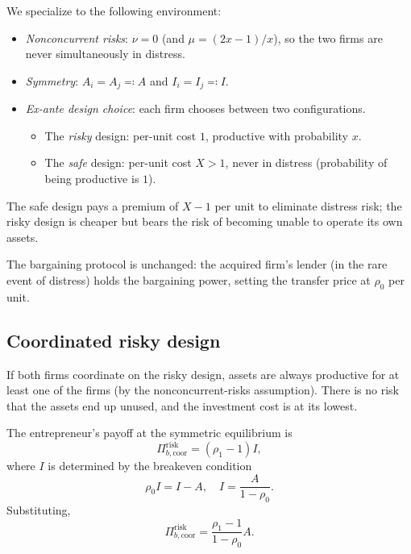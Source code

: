 \documentclass[11pt,a4paper,oneside]{book}
\theoremstyle{plain}
\theoremstyle{definition}
\theoremstyle{remark}
\numberwithin{equation}{chapter}
\begin{document}
We specialize to the following environment:
\begin{itemize}
  \item \emph{Nonconcurrent risks}: $\nu = 0$ (and $\mu = (2x - 1)/x$), so the two firms are never simultaneously in distress.
  \item \emph{Symmetry}: $A_i = A_j \eqqcolon A$ and $I_i = I_j \eqqcolon I$.
  \item \emph{Ex-ante design choice}: each firm chooses between two configurations.
  \begin{itemize}
    \item The \emph{risky} design: per-unit cost $1$, productive with probability $x$.
    \item The \emph{safe} design: per-unit cost $X > 1$, never in distress (probability of being productive is $1$).
  \end{itemize}
\end{itemize}
The safe design pays a premium of $X - 1$ per unit to eliminate distress risk; the risky design is cheaper but bears the risk of becoming unable to operate its own assets.

The bargaining protocol is unchanged: the acquired firm's lender (in the rare event of distress) holds the bargaining power, setting the transfer price at $\rho_0$ per unit.

\subsection{Coordinated risky design}

If both firms coordinate on the risky design, assets are always productive for at least one of the firms (by the nonconcurrent-risks assumption).
There is no risk that the assets end up unused, and the investment cost is at its lowest.

The entrepreneur's payoff at the symmetric equilibrium is
\begin{equation*}
  \Pi_{b, \text{coor}}^{\text{risk}} = (\rho_1 - 1) I,
\end{equation*}
where $I$ is determined by the breakeven condition
\begin{equation*}
  \rho_0 I = I - A,
  \quad I = \frac{A}{1 - \rho_0}.
\end{equation*}
Substituting,
\begin{equation}\label{eq:ma-coord-risk}
  \Pi_{b, \text{coor}}^{\text{risk}} = \frac{\rho_1 - 1}{1 - \rho_0} A.
\end{equation}
\end{document}
